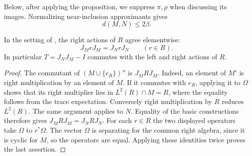 Below, after applying the proposition, we suppress $\pi,\rho$
when discussing its images.  Normalizing near-inclusion approximants gives
\begin{equation}
 d(M,N)\le 2\beta.
 \label{eq:standard-gap}
\end{equation}

\begin{lemma}
\label{lem:finite-right-action}
In the setting of , the right actions
of $R$ agree elementwise:
\[
 J_M rJ_M=J_N rJ_N\qquad(r\in R).
\]
In particular $T=J_NJ_M-I$ commutes with the left and right actions of $R$.
\end{lemma}
\begin{proof}
The commutant of $(M\cup\{e_R\})''$ is $J_MRJ_M$.  Indeed, an element
of $M'$ is right multiplication by an element of $M$.  If it commutes
with $e_R$, applying it to $\Omega$ shows that its right multiplier lies
in $L^2(R)\cap M=R$, where the equality follows from the trace
expectation.  Conversely right multiplication by $R$ reduces $L^2(R)$.
The same argument applies to $N$.  Equality of the basic constructions
therefore gives $J_MRJ_M=J_NRJ_N$.  For each $r\in R$ the two displayed
operators take $\Omega$ to $r^*\Omega$.  The vector $\Omega$ is
separating for the common right algebra, since it is cyclic for $M$, so
the operators are equal.  Applying these identities twice proves the last assertion.
\end{proof}

